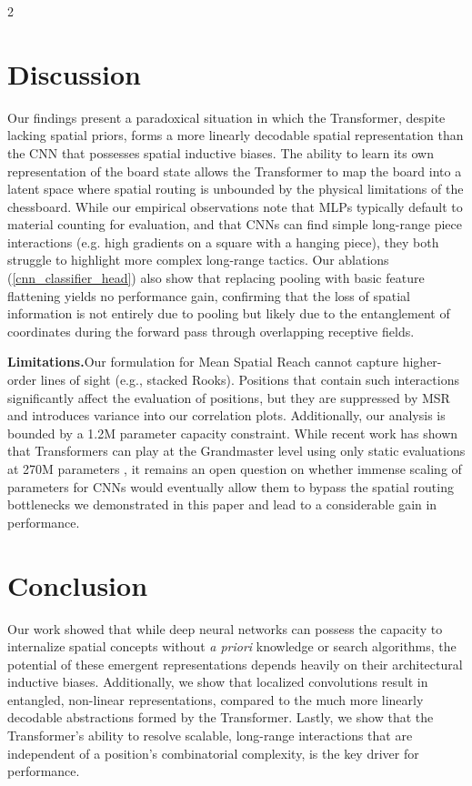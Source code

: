 \documentclass[a4paper,10pt]{article}
\begin{document}
\begin{multicols*}{2}
\section{Discussion}
Our findings present a paradoxical situation in which the Transformer, despite lacking spatial priors, forms a more linearly decodable spatial representation than the CNN that possesses spatial inductive biases. The ability to learn its own representation of the board state allows the Transformer to map the board into a latent space where spatial routing is unbounded by the physical limitations of the chessboard. While our empirical observations note that MLPs typically default to material counting for evaluation, and that CNNs can find simple long-range piece interactions (e.g. high gradients on a square with a hanging piece), they both struggle to highlight more complex long-range tactics. Our ablations (\autoref{cnn_classifier_head}) also show that replacing pooling with basic feature flattening yields no performance gain, confirming that the loss of spatial information is not entirely due to pooling but likely due to the entanglement of coordinates during the forward pass through overlapping receptive fields.

\textbf{Limitations.}\enskip Our formulation for Mean Spatial Reach cannot capture higher-order lines of sight (e.g., stacked Rooks). Positions that contain such interactions significantly affect the evaluation of positions, but they are suppressed by MSR and introduces variance into our correlation plots. Additionally, our analysis is bounded by a 1.2M parameter capacity constraint. While recent work has shown that Transformers can play at the Grandmaster level using only static evaluations at 270M parameters \cite{ruoss2024grandmaster}, it remains an open question on whether immense scaling of parameters for CNNs would eventually allow them to bypass the spatial routing bottlenecks we demonstrated in this paper and lead to a considerable gain in performance.

\section{Conclusion}
Our work showed that while deep neural networks can possess the capacity to internalize spatial concepts without \textit{a priori} knowledge or search algorithms, the potential of these emergent representations depends heavily on their architectural inductive biases. Additionally, we show that localized convolutions result in entangled, non-linear representations, compared to the much more linearly decodable abstractions formed by the Transformer. Lastly, we show that the Transformer's ability to resolve scalable, long-range interactions that are independent of a position's combinatorial complexity, is the key driver for performance.


\end{multicols*}
\end{document}
